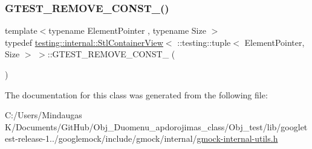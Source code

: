 \mbox{\label{classtesting_1_1internal_1_1_stl_container_view_3_01_1_1testing_1_1tuple_3_01_element_pointer_00_01_size_01_4_01_4_a2b1dd06842cb431ef647b85707ce52ff}} 
\subsubsection{\texorpdfstring{GTEST\_REMOVE\_CONST\_()}{GTEST\_REMOVE\_CONST\_()}}
{\footnotesize\ttfamily template$<$typename Element\+Pointer , typename Size $>$ \\
typedef \mbox{\hyperlink{classtesting_1_1internal_1_1_stl_container_view}{testing\+::internal\+::\+Stl\+Container\+View}}$<$ \+::testing\+::tuple$<$ Element\+Pointer, Size $>$ $>$\+::G\+T\+E\+S\+T\+\_\+\+R\+E\+M\+O\+V\+E\+\_\+\+C\+O\+N\+S\+T\+\_\+ (\begin{DoxyParamCaption}\item[{typename \mbox{\hyperlink{structtesting_1_1internal_1_1_pointee_of}{internal\+::\+Pointee\+Of}}$<$ Element\+Pointer $>$\+::\mbox{\hyperlink{classtesting_1_1internal_1_1_stl_container_view_3_01_1_1testing_1_1tuple_3_01_element_pointer_00_01_size_01_4_01_4_aedefb897170f76518afbca6f87b5467c}{type}}}]{ }\end{DoxyParamCaption})}



The documentation for this class was generated from the following file\+:\begin{DoxyCompactItemize}
\item 
C\+:/\+Users/\+Mindaugas K/\+Documents/\+Git\+Hub/\+Obj\+\_\+\+Duomenu\+\_\+apdorojimas\+\_\+class/\+Obj\+\_\+test/lib/googletest-\/release-\/1../googlemock/include/gmock/internal/\mbox{\hyperlink{_obj__test_2lib_2googletest-release-1_88_81_2googlemock_2include_2gmock_2internal_2gmock-internal-utils_8h}{gmock-\/internal-\/utils.\+h}}\end{DoxyCompactItemize}
